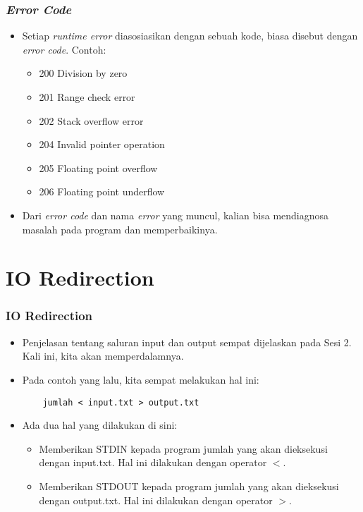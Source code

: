 \begin{frame}
\frametitle{\textit{Error Code}}
\begin{itemize}
  \item Setiap \textit{runtime error} diasosiasikan dengan sebuah kode, biasa disebut dengan \alert{\textit{error code}}. Contoh:
  \begin{itemize}
    \item 200 Division by zero
    \item 201 Range check error
    \item 202 Stack overflow error
    \item 204 Invalid pointer operation
    \item 205 Floating point overflow
    \item 206 Floating point underflow
  \end{itemize}
  \item Dari \textit{error code} dan nama \textit{error} yang muncul, kalian bisa mendiagnosa masalah pada program dan memperbaikinya.
\end{itemize}
\end{frame}

\section{IO Redirection}
\frame{\sectionpage}

\begin{frame}[fragile]
\frametitle{IO Redirection}
\begin{itemize}
  \item Penjelasan tentang saluran input dan output sempat dijelaskan pada Sesi 2. Kali ini, kita akan memperdalamnya.
  \item Pada contoh yang lalu, kita sempat melakukan hal ini:
  \begin{lstlisting}
    jumlah < input.txt > output.txt
  \end{lstlisting}
  \item Ada dua hal yang dilakukan di sini:
  \begin{itemize}
    \item Memberikan STDIN kepada program jumlah yang akan dieksekusi dengan input.txt. Hal ini dilakukan dengan operator $<$.
    \item Memberikan STDOUT kepada program jumlah yang akan dieksekusi dengan output.txt. Hal ini dilakukan dengan operator $>$.
  \end{itemize}
\end{itemize}
\end{frame}

